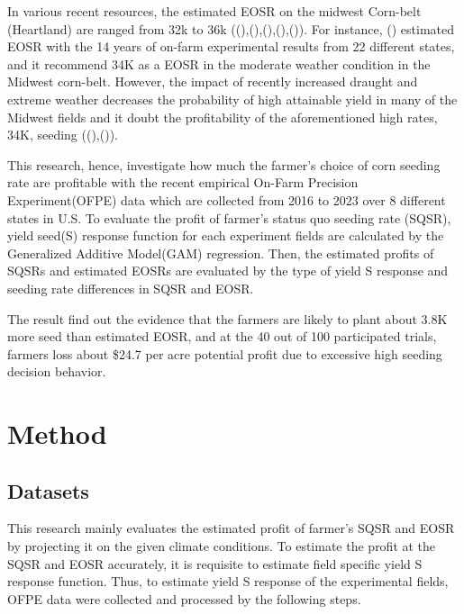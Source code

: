 \documentclass[
]{article}
\begin{document}
In various recent resources, the estimated EOSR on the midwest Corn-belt
(Heartland) are ranged from 32k to 36k
((),(),(),(),()).
For instance, () estimated EOSR
with the 14 years of on-farm experimental results from 22 different
states, and it recommend 34K as a EOSR in the moderate weather condition
in the Midwest corn-belt. However, the impact of recently increased
draught and extreme weather decreases the probability of high attainable
yield in many of the Midwest fields and it doubt the profitability of
the aforementioned high rates, 34K, seeding
((),()).

This research, hence, investigate how much the farmer's choice of corn
seeding rate are profitable with the recent empirical On-Farm Precision
Experiment(OFPE) data which are collected from 2016 to 2023 over 8
different states in U.S. To evaluate the profit of farmer's status quo
seeding rate (SQSR), yield seed(S) response function for each experiment
fields are calculated by the Generalized Additive Model(GAM) regression.
Then, the estimated profits of SQSRs and estimated EOSRs are evaluated
by the type of yield S response and seeding rate differences in SQSR and
EOSR.

The result find out the evidence that the farmers are likely to plant
about 3.8K more seed than estimated EOSR, and at the 40 out of 100
participated trials, farmers loss about \$24.7 per acre potential profit
due to excessive high seeding decision behavior.

\section{Method}\label{method}

\subsection{Datasets}\label{datasets}

This research mainly evaluates the estimated profit of farmer's SQSR and
EOSR by projecting it on the given climate conditions. To estimate the
profit at the SQSR and EOSR accurately, it is requisite to estimate
field specific yield S response function. Thus, to estimate yield S
response of the experimental fields, OFPE data were collected and
processed by the following steps.
\end{document}

